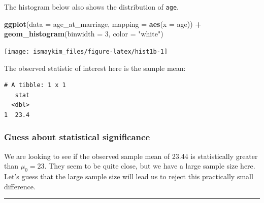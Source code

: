 \documentclass[12pt,]{krantz}
\makeatletter
\newenvironment{Shaded}{\begin{snugshade}}{\end{snugshade}}
\newcommand{\KeywordTok}[1]{\textcolor[rgb]{0.27,0.27,0.27}{\textbf{#1}}}
\newcommand{\DataTypeTok}[1]{\textcolor[rgb]{0.27,0.27,0.27}{#1}}
\newcommand{\DecValTok}[1]{\textcolor[rgb]{0.06,0.06,0.06}{#1}}
\newcommand{\StringTok}[1]{\textcolor[rgb]{0.5,0.5,0.5}{#1}}
\newcommand{\OperatorTok}[1]{\textcolor[rgb]{0.43,0.43,0.43}{\textbf{#1}}}
\newcommand{\NormalTok}[1]{#1}
\newenvironment{kframe}{%
\medskip{}
\setlength{\fboxsep}{.8em}
 \def\at@end@of@kframe{}%
 \ifinner\ifhmode%
  \def\at@end@of@kframe{\end{minipage}}%
  \begin{minipage}{\columnwidth}%
 \fi\fi%
 \def\FrameCommand##1{\hskip\@totalleftmargin \hskip-\fboxsep
 \colorbox{shadecolor}{##1}\hskip-\fboxsep
     \hskip-\linewidth \hskip-\@totalleftmargin \hskip\columnwidth}%
 \MakeFramed {\advance\hsize-\width
   \@totalleftmargin\z@ \linewidth\hsize
   \@setminipage}}%
 {\par\unskip\endMakeFramed%
 \at@end@of@kframe}
\renewenvironment{Shaded}{\begin{kframe}}{\end{kframe}}
\theoremstyle{definition}
\theoremstyle{definition}
\theoremstyle{definition}
\theoremstyle{remark}
\makeatother
\begin{document}
The histogram below also shows the distribution of \texttt{age}.

\begin{Shaded}
\begin{Highlighting}[]
\KeywordTok{ggplot}\NormalTok{(}\DataTypeTok{data =}\NormalTok{ age_at_marriage, }\DataTypeTok{mapping =} \KeywordTok{aes}\NormalTok{(}\DataTypeTok{x =}\NormalTok{ age)) }\OperatorTok{+}
\StringTok{  }\KeywordTok{geom_histogram}\NormalTok{(}\DataTypeTok{binwidth =} \DecValTok{3}\NormalTok{, }\DataTypeTok{color =} \StringTok{"white"}\NormalTok{)}
\end{Highlighting}
\end{Shaded}

\begin{center}\texttt{[image: ismaykim\_files/figure-latex/hist1b-1]} \end{center}

The observed statistic of interest here is the sample mean:

\begin{Shaded}
\end{Shaded}

\begin{verbatim}
# A tibble: 1 x 1
   stat
  <dbl>
1  23.4
\end{verbatim}

\subsubsection*{Guess about statistical
significance}\label{guess-about-statistical-significance}

We are looking to see if the observed sample mean of 23.44 is
statistically greater than \(\mu_0 = 23\). They seem to be quite close,
but we have a large sample size here. Let's guess that the large sample
size will lead us to reject this practically small difference.

\begin{center}\rule{0.5\linewidth}{\linethickness}\end{center}
\end{document}
